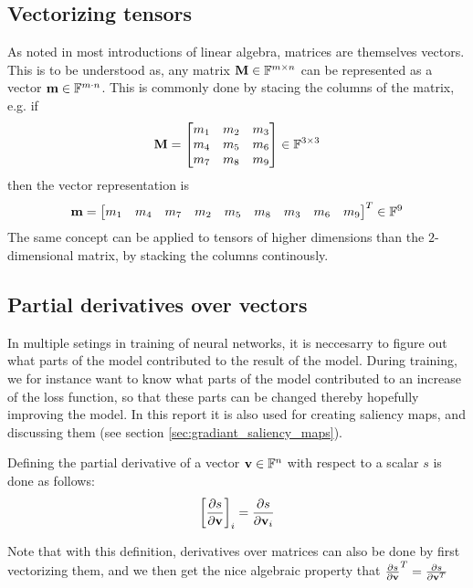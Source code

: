 \subsection{Vectorizing tensors}
As noted in most introductions of linear algebra, matrices are themselves vectors.
This is to be understood as, any matrix $\textbf{M} \in \mathbb{F}^{m\times n}$ can be represented as a vector $\textbf{m} \in \mathbb{F}^{m\cdot n}$.
This is commonly done by stacing the columns of the matrix, e.g.  if 
\begin{equation}
\textbf{M} = \begin{bmatrix}
    m_1 & m_2 & m_3 \\
    m_4 & m_5 & m_6 \\
    m_7 & m_8 & m_9
\end{bmatrix} \in \mathbb{F}^{3 \times 3}
\end{equation}
then the vector representation is
\begin{equation}
\textbf{m} = \begin{bmatrix}
    m_1 & m_4 & m_7 & m_2 & m_5 & m_8 & m_3 & m_6 & m_9
\end{bmatrix}^T \in \mathbb{F}^{9}
\end{equation}
The same concept can be applied to tensors of higher dimensions than the $2$-dimensional matrix,
by stacking the columns continously.

\subsection{Partial derivatives over vectors} \label{sec:partial_derivatives_of_scalar_over_vector}
In multiple setings in training of neural networks, it is neccesarry to figure out what
parts of the model contributed to the result of the model.
During training, we for instance want to know what parts of the model contributed to an increase of the loss function,
so that these parts can be changed thereby hopefully improving the model.
In this report it is also used for creating saliency maps, and discussing them (see section \ref{sec:gradiant_saliency_maps}).

Defining the partial derivative of a vector $\textbf{v}\in\mathbb{F}^n$ with respect to a scalar $s$ is done as follows:
\begin{equation}
    \left[ \frac{\partial s}{\partial \textbf{v}} \right]_i 
         = \frac{\partial s}{\partial \textbf{v}_i}
\end{equation}

Note that with this definition, derivatives over matrices can also be done by first vectorizing them,
and we then get the nice algebraic property that  $\frac{\partial s}{\partial \textbf{v}}^{T} = \frac{\partial s}{\partial \textbf{v}^{T}}$ 


